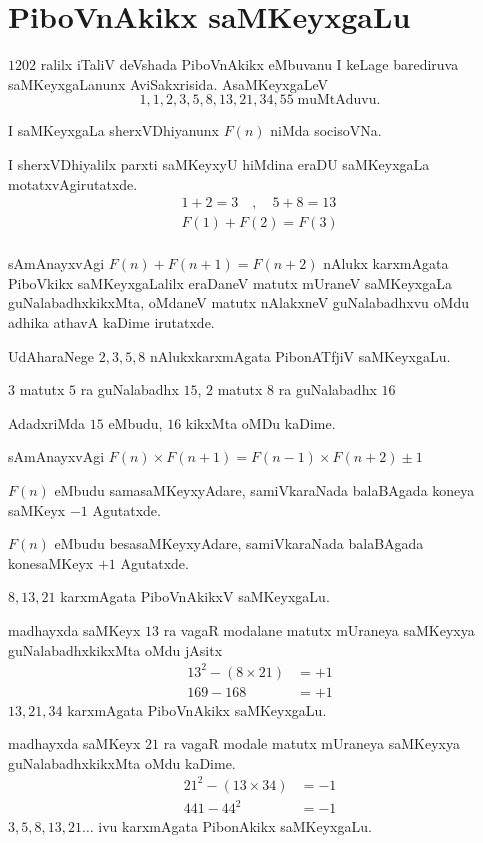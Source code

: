 \chapter{PiboVnAkikx saMKeyxgaLu}

$1202$ ralilx iTaliV deVshada PiboVnAkikx eMbuvanu I keLage barediruva saMKeyxgaLanunx AviSakxrisida. AsaMKeyxgaLeV
$$
1,1,2,3,5,8,13,21,34,55 \;  \text{muMtAduvu}.
$$ 

I saMKeyxgaLa sherxVDhiyanunx $F(n)$ niMda socisoVNa.

I sherxVDhiyalilx parxti saMKeyxyU hiMdina eraDU saMKeyxgaLa motatxvAgirutatxde.
\begin{gather*}
1+2=3\quad , \quad 5+8=13\\
F(1)+F(2) = F(3)\\
 \end{gather*}

sAmAnayxvAgi $F(n) + F(n+1) = F(n+2)$ nAlukx karxmAgata PiboVkikx saMKeyxgaLalilx eraDaneV matutx mUraneV saMKeyxgaLa guNalabadhxkikxMta, oMdaneV matutx nAlakxneV guNalabadhxvu oMdu adhika athavA kaDime irutatxde.

UdAharaNege \quad $2,3,5,8$ nAlukxkarxmAgata PibonATfjiV saMKeyxgaLu.

$3$ matutx $5$ ra guNalabadhx $15$, $2$ matutx $8$ ra guNalabadhx $16$  

AdadxriMda $15$ eMbudu, $16$ kikxMta oMDu kaDime.

sAmAnayxvAgi $F(n)\times F(n+1) = F(n-1)\times F(n+2)\pm1$ 

$F(n)$ eMbudu samasaMKeyxyAdare, samiVkaraNada balaBAgada koneya saMKeyx $-1$ Agutatxde.

$F(n)$ eMbudu besasaMKeyxyAdare, samiVkaraNada balaBAgada konesaMKeyx $+1$ Agutatxde.

$8,13,21$ karxmAgata PiboVnAkikxV saMKeyxgaLu.

madhayxda saMKeyx $13$ ra vagaR modalane matutx mUraneya saMKeyxya guNalabadhxkikxMta oMdu jAsitx
\begin{align*}
13^2-(8\times 21) &=+1\\
169-168 &= +1
\end{align*}
$13,21,34$ karxmAgata PiboVnAkikx saMKeyxgaLu. 

madhayxda saMKeyx $21$ ra vagaR  modale  matutx mUraneya saMKeyxya guNalabadhxkikxMta oMdu kaDime.
\begin{align*}
21^2 - (13\times 34) &= -1 \\
441-44^2 &= -1
\end{align*}
$3,5,8,13,21\hdots$ ivu karxmAgata PibonAkikx saMKeyxgaLu.

